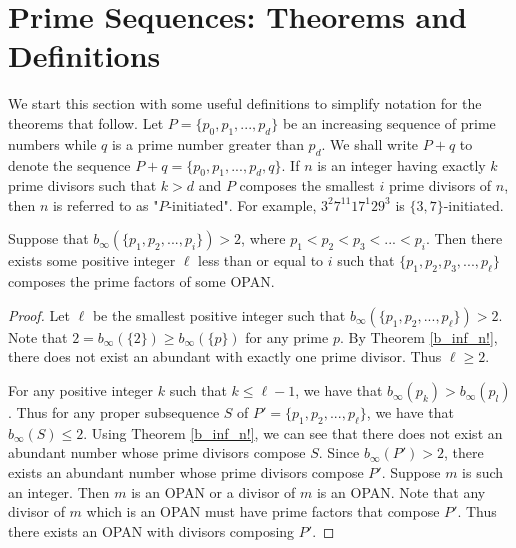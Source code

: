 \documentclass[../paper.tex]{subfiles}
\begin{document}
\section{Prime Sequences: Theorems and Definitions}

We start this section with some useful definitions to simplify
notation for the theorems that follow. Let $P = \{p_0, p_1, ...,
p_d\}$ be an increasing sequence of prime numbers while $q$ 
is a prime number greater than $p_d$. We shall write $P + q$
to denote the sequence $P + q = \{p_0, p_1, ..., p_d, q\}$. If $n$ 
is an integer having exactly $k$ prime divisors such that $k > d$ 
and $P$ composes the smallest $i$ prime divisors of $n$, then 
$n$ is referred to as "$P$-initiated". For example, $3^2 7^{11} 
17^1 29^3$ is $\{3, 7\}$-initiated.

\begin{theorem} \label{Primechops}
Suppose that $b_{\infty}(\{p_1,p_2, ..., p_i\}) > 2$,
where $p_1 < p_2 < p_3 < ... < p_i$. Then there exists some
positive integer $\ell$ less than or equal to $i$ such that 
$\{p_1, p_2, p_3, ..., p_\ell\}$ composes the prime factors of
some OPAN.
\end{theorem}

\begin{proof}
Let $\ell$ be the smallest positive integer such that 
$b_{\infty}(\{p_1, p_2, ..., p_\ell\}) > 2$. Note that
$2 = b_{\infty}(\{2\}) \geq b_{\infty}(\{p\})$ for any prime $p$.
By Theorem {\ref{b_inf_n!}}, there does not
exist an abundant with exactly one prime divisor. Thus $\ell 
\geq 2$.

For any positive integer $k$ such that $k \leq \ell - 1$, we have
that $b_{\infty}(p_k) > b_{\infty}(p_l)$. Thus for any proper 
subsequence $S$ of $P' = \{p_1, p_2, ..., p_{\ell}\}$, we have that 
$b_{\infty}(S) \leq 2$. Using Theorem {\ref{b_inf_n!}}, we can see
that there does not exist an abundant number whose prime divisors
compose $S$. Since $b_{\infty}(P') > 2$, there exists an abundant 
number whose prime
divisors compose $P'$. Suppose $m$ is such an integer. Then $m$ is
an OPAN or a divisor of $m$ is an OPAN. Note that any divisor of $m$
which is an OPAN must have prime factors that compose $P'$. Thus
there exists an OPAN with divisors composing $P'$.
\end{proof}

\end{document}
